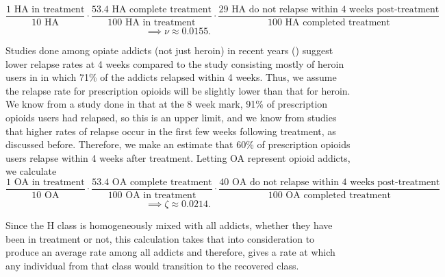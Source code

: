 \documentclass[12pt]{article}
\begin{document}
$$\frac{1 \text{ HA in treatment}}{10 \text{ HA}} \cdot \frac{53.4 \text{ HA complete treatment}}{100 \text{ HA in treatment}} \cdot \frac{29 \text{ HA do not relapse within 4 weeks post-treatment}}{100 \text{ HA completed treatment}}$$
$$\implies \nu \approx  0.0155.$$

Studies done among opiate addicts (not just heroin) in recent years (\cite{Bailey, Broers}) suggest lower relapse rates at 4 weeks compared to the study consisting mostly of heroin users in \cite{Smyth} in which 71\% of the addicts relapsed within 4 weeks. Thus, we assume the relapse rate for prescription opioids will be slightly lower than that for heroin. We know from a study done in \cite{Weiss} that at the 8 week mark, 91\% of prescription opioids users had relapsed, so this is an upper limit, and we know from studies that higher rates of relapse occur in the first few weeks following treatment, as discussed before. Therefore, we make an estimate that 60\% of prescription opioids users relapse within 4 weeks after treatment. Letting OA represent opioid addicts, we calculate 
$$\frac{1 \text{ OA in treatment}}{10 \text{ OA}} \cdot \frac{53.4 \text{ OA complete treatment}}{100 \text{ OA in treatment}} \cdot \frac{40 \text{ OA do not relapse within 4 weeks post-treatment}}{100 \text{ OA completed treatment}}$$
$$\implies \zeta \approx  0.0214.$$

Since the H class is homogeneously mixed with all addicts, whether they have been in treatment or not, this calculation takes that into consideration to produce an average rate among all addicts and therefore, gives a rate at which any individual from that class would transition to the recovered class. \\
\end{document}
